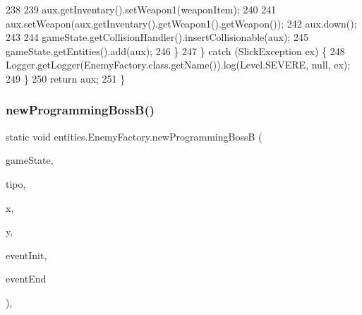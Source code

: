 \begin{DoxyCode}
238                 
239                 aux.getInventary().setWeapon1(weaponItem);
240 
241                 aux.setWeapon(aux.getInventary().getWeapon1().getWeapon());
242                 aux.down();
243 
244                 gameState.getCollisionHandler().insertCollisionable(aux);
245                 gameState.getEntities().add(aux);
246             \}
247         \} \textcolor{keywordflow}{catch} (SlickException ex) \{
248             Logger.getLogger(EnemyFactory.class.getName()).log(Level.SEVERE, null, ex);
249         \}
250         \textcolor{keywordflow}{return} aux;
251     \}
\end{DoxyCode}
\mbox{\label{classentities_1_1_enemy_factory_a6f35aad14a67ec068f8a2c555a26a7ee}} 
\subsubsection{\texorpdfstring{new\+Programming\+Boss\+B()}{newProgrammingBossB()}}
{\footnotesize\ttfamily static void entities.\+Enemy\+Factory.\+new\+Programming\+BossB (\begin{DoxyParamCaption}\item[{final \mbox{\hyperlink{classstates_1_1_game_state}{Game\+State}}}]{game\+State,  }\item[{int}]{tipo,  }\item[{int}]{x,  }\item[{int}]{y,  }\item[{\mbox{\hyperlink{interfaceentities_1_1_event_launcher}{Event\+Launcher}}}]{event\+Init,  }\item[{\mbox{\hyperlink{interfaceentities_1_1_event_launcher}{Event\+Launcher}}}]{event\+End }\end{DoxyParamCaption})\hspace{0.3cm}{\ttfamily [inline]}, {\ttfamily [static]}}



